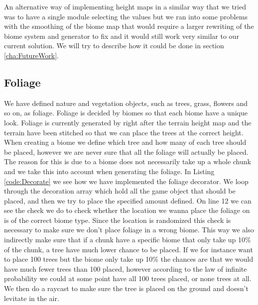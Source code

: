 An alternative way of implementing height maps in a similar way that we tried was to have a single module selecting the values but we ran into some problems with the smoothing of the biome map that would require a larger rewriting of the biome system and generator to fix and it would still work very similar to our current solution. We will try to describe how it could be done in section \ref{cha:FutureWork}.


\subsection{Foliage}

We have defined nature and vegetation objects, such as trees, grass, flowers and so on, as foliage. Foliage is decided by biomes so that each biome have a unique look. Foliage is currently generated by right after the terrain height map and the terrain have been stitched so that we can place the trees at the correct height. When creating a biome we define which tree and how many of each tree should be placed, however we are never sure that all the foliage will actually be placed. The reason for this is due to a biome does not necessarily take up a whole chunk and we take this into account when generating the foliage. In Listing \ref{code:Decorate} we see how we have implemented the foliage decorator. We loop through the decoration array which hold all the game object that should be placed, and then we try to place the specified amount defined. On line 12 we can see the check we do to check whether the location we wanna place the foliage on is of the correct biome type. Since the location is randomized this check is necessary to make sure we don't place foliage in a wrong biome. This way we also indirectly make sure that if a chunk have a specific biome that only take up 10\% of the chunk, a tree have much lower chance to be placed. If we for instance want to place 100 trees but the biome only take up 10\% the chances are that we would have much fewer trees than 100 placed, however according to the law of infinite probability we could at some point have all 100 trees placed, or none trees at all. We then do a raycast to make sure the tree is placed on the ground and doesn't levitate in the air.

